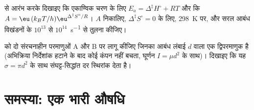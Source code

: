 \begin{exercise}[$\star\star\star$]\label{exo:b3:rate-theories:11}
 से आरंभ करके दिखाइए कि एकाण्विक चरण के लिए $E_a = \Delta^{\ddagger}H^\circ + RT$
और कि $A = \eu\,(k_BT/h)\eu^{\Delta^{\ddagger}S^\circ/R}$। $A$ निकालिए, $\Delta^{\ddagger}S^\circ = 0$ के लिए,
\qty{298}{K} पर, और सरल आबंध विखंडनों के $10^{13}$ से $10^{14}$~\unit{s^{-1}} से तुलना कीजिए।
\end{exercise}

\begin{exercise}[$\star\star\star$]\label{exo:b3:rate-theories:12}
 को दो संरचनाहीन परमाणुओं A और B पर लागू कीजिए जिनका  आबंध लंबाई $d$ वाला एक द्विपरमाणुक है (अभिक्रिया
निर्देशांक हटाने के बाद कोई कंपन नहीं बचता, घूर्णन $I = \mu d^2$ के साथ)। दिखाइए कि यह
$\sigma = \pi d^2$ के साथ संघट्ट-सिद्धांत दर स्थिरांक देता है।
\end{exercise}

\section{समस्या: एक भारी औषधि}

